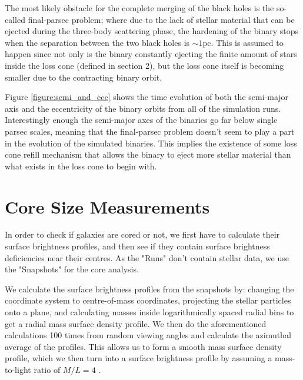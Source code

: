 \documentclass[english, oneside]{HYgradu}
\begin{document}

The most likely obstacle for the complete merging of the black holes is the so-called final-parsec problem; where due to the lack of stellar material that can be ejected during the three-body scattering phase, the hardening of the binary stops when the separation between the two black holes is $\sim 1 \mathrm{pc}$. This is assumed to happen since not only is the binary constantly ejecting the finite amount of stars inside the loss cone (defined in section 2), but the loss cone itself is becoming smaller due to the contracting binary orbit.

Figure \ref{figure:semi_and_ecc} shows the time evolution of both the semi-major axis and the eccentricity of the binary orbits from all of the simulation runs. Interestingly enough the semi-major axes of the binaries go far below single parsec scales, meaning that the final-parsec problem doesn't seem to play a part in the evolution of the simulated binaries. This implies the existence of some loss cone refill mechanism that allows  the binary to eject more stellar material than what exists in the loss cone to begin with.


\section{Core Size Measurements}

In order to check if galaxies are cored or not, we first have to calculate their surface brightness profiles, and then see if they contain surface brightness deficiencies near their centres. As the "Runs" don't contain stellar data, we use the "Snapshots" for the core analysis. 

We calculate the surface brightness profiles from the snapshots by: changing the coordinate system to centre-of-mass coordinates, projecting the stellar particles onto a plane, and calculating masses inside logarithmically spaced radial bins to get a radial mass surface density profile. We then do the aforementioned calculations 100 times from random viewing angles and calculate the azimuthal average of the profiles. This allows us to form a smooth mass surface density profile, which we then turn into a surface brightness profile by assuming a mass-to-light ratio of $M/L = 4$ \citep{Rantala2018}.
\end{document}
